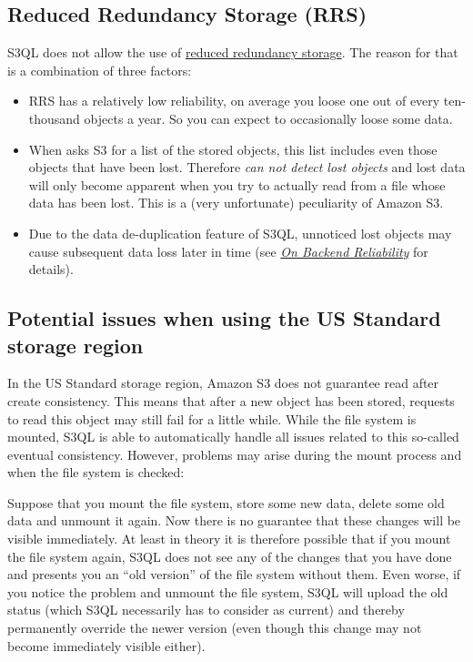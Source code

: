 \documentclass[letterpaper,10pt,english]{sphinxmanual}
\begin{document}
\subsection{Reduced Redundancy Storage (RRS)}
\label{backends:reduced-redundancy-storage-rrs}
S3QL does not allow the use of \href{http://aws.amazon.com/s3/\#protecting}{reduced redundancy storage}. The reason for that is a
combination of three factors:
\begin{itemize}
\item {} 
RRS has a relatively low reliability, on average you loose one
out of every ten-thousand objects a year. So you can expect to
occasionally loose some data.

\item {} 
When  asks S3 for a list of the stored objects, this list
includes even those objects that have been lost. Therefore
 \emph{can not detect lost objects} and lost data will only
become apparent when you try to actually read from a file whose data
has been lost. This is a (very unfortunate) peculiarity of Amazon
S3.

\item {} 
Due to the data de-duplication feature of S3QL, unnoticed lost
objects may cause subsequent data loss later in time (see
{\hyperref[general:backend-reliability]{\emph{On Backend Reliability}}} for details).

\end{itemize}


\subsection{Potential issues when using the US Standard storage region}
\label{backends:potential-issues-when-using-the-us-standard-storage-region}
In the US Standard storage region, Amazon S3 does not guarantee read
after create consistency. This means that after a new object has been
stored, requests to read this object may still fail for a little
while. While the file system is mounted, S3QL is able to automatically
handle all issues related to this so-called eventual consistency.
However, problems may arise during the mount process and when the file
system is checked:

Suppose that you mount the file system, store some new data, delete
some old data and unmount it again. Now there is no guarantee that
these changes will be visible immediately. At least in theory it is
therefore possible that if you mount the file system again, S3QL
does not see any of the changes that you have done and presents you
an ``old version'' of the file system without them. Even worse, if you
notice the problem and unmount the file system, S3QL will upload the
old status (which S3QL necessarily has to consider as current) and
thereby permanently override the newer version (even though this
change may not become immediately visible either).
\end{document}
